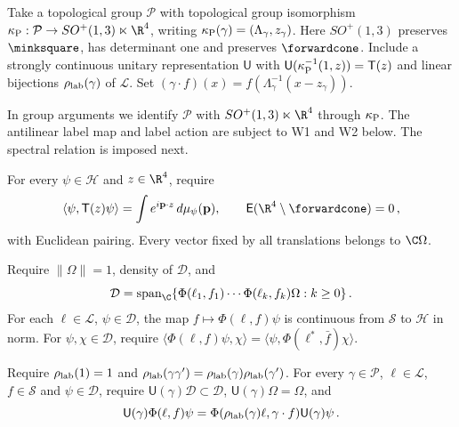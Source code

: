 \begin{definition}\label{def:D14b}
Take a topological group $\mathcal P$ with topological group isomorphism $\kappa_{\rm P}:\mathcal P\to SO^+(1,3)\ltimes\R^4$, writing $\kappa_{\rm P}(\gamma)=(\Lambda_\gamma,z_\gamma)$. Here $SO^+(1,3)$ preserves $\minksquare$, has determinant one and preserves $\forwardcone$. Include a strongly continuous unitary representation $\mathsf U$ with $\mathsf U(\kappa_{\rm P}^{-1}(1,z))=\mathsf T(z)$ and linear bijections $\rho_{\rm lab}(\gamma)$ of $\mathcal L$. Set $(\gamma\cdot f)(x)=f(\Lambda_\gamma^{-1}(x-z_\gamma))$.
\end{definition}

In group arguments we identify $\mathcal P$ with $SO^+(1,3)\ltimes\R^4$ through $\kappa_{\rm P}$. The antilinear label map and label action are subject to W1 and W2 below. The spectral relation is imposed next.

\begin{definition}\label{def:W0}
For every $\psi\in\mathcal H$ and $z\in\R^4$, require
\begin{equation*}
\langle\psi,\mathsf T(z)\psi\rangle=\int e^{i\mathbf p\cdot z}\,d\mu_\psi(\mathbf p),\qquad \mathsf E(\R^4\setminus\forwardcone)=0\,,
\end{equation*}
with Euclidean pairing. Every vector fixed by all translations belongs to $\C\Omega$.
\end{definition}

\begin{definition}\label{def:W1}
Require $\|\Omega\|=1$, density of $\mathcal D$, and
\begin{equation*}
\mathcal D=\operatorname{span}_{\C}\{\Phi(\ell_1,f_1)\cdots\Phi(\ell_k,f_k)\Omega:k\ge0\}\,.
\end{equation*}
For each $\ell\in\mathcal L$, $\psi\in\mathcal D$, the map $f\mapsto\Phi(\ell,f)\psi$ is continuous from $\mathcal S$ to $\mathcal H$ in norm. For $\psi,\chi\in\mathcal D$, require $\langle\Phi(\ell,f)\psi,\chi\rangle=\langle\psi,\Phi(\ell^*,\bar f)\chi\rangle$.
\end{definition}

\begin{definition}[W2. Covariance]\label{def:W2}
Require $\rho_{\rm lab}(1)=1$ and $\rho_{\rm lab}(\gamma\gamma')=\rho_{\rm lab}(\gamma)\rho_{\rm lab}(\gamma')$. For every $\gamma\in\mathcal P$, $\ell\in\mathcal L$, $f\in\mathcal S$ and $\psi\in\mathcal D$, require $\mathsf U(\gamma)\mathcal D\subset\mathcal D$, $\mathsf U(\gamma)\Omega=\Omega$, and
\begin{equation*}
\mathsf U(\gamma)\Phi(\ell,f)\psi=\Phi(\rho_{\rm lab}(\gamma)\ell,\gamma\cdot f)\mathsf U(\gamma)\psi\,.
\end{equation*}
\end{definition}

